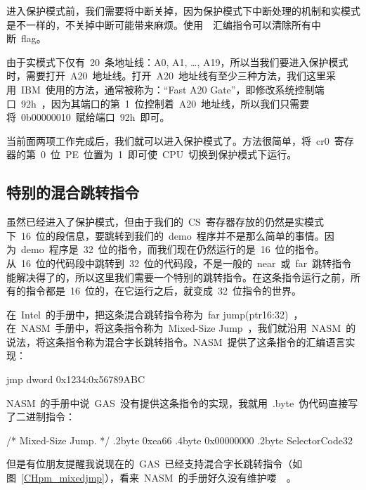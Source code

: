 进入保护模式前，我们需要将中断关掉，因为保护模式下中断处理的机制和实模式是不一样的，不关掉中断可能带来麻烦。使用~~汇编指令可以清除所有中断~flag。

由于实模式下仅有~20~条地址线：A0, A1, \ldots, A19，所以当我们要进入保护模式时，需要打开~A20~地址线。打开~A20~地址线有至少三种方法，我们这里采用~IBM~使用的方法，通常被称为：“Fast A20 Gate”，即修改系统控制端口~92h~，因为其端口的第~1~位控制着~A20~地址线，所以我们只需要将~0b00000010~赋给端口~92h~即可。

当前面两项工作完成后，我们就可以进入保护模式了。方法很简单，将~cr0~寄存器的第~0~位~PE~位置为~1~即可使~CPU~切换到保护模式下运行。

\label{CHpm_enablepm}

\subsection{特别的混合跳转指令}

虽然已经进入了保护模式，但由于我们的~CS~寄存器存放的仍然是实模式下~16~位的段信息，要跳转到我们的~demo~程序并不是那么简单的事情。因为~demo~程序是~32~位的指令，而我们现在仍然运行的是~16~位的指令。从~16~位的代码段中跳转到~32~位的代码段，不是一般的~near~或~far~跳转指令能解决得了的，所以这里我们需要一个特别的跳转指令。在这条指令运行之前，所有的指令都是~16~位的，在它运行之后，就变成~32~位指令的世界。

在~Intel~的手册中，把这条混合跳转指令称为~far jump(ptr16:32)~，在~NASM~手册中，将这条指令称为~Mixed-Size Jump~，我们就沿用~NASM~的说法，将这条指令称为混合字长跳转指令。NASM~提供了这条指令的汇编语言实现：
\begin{Command}
jmp dword 0x1234:0x56789ABC
\end{Command}
NASM~的手册中说~GAS~没有提供这条指令的实现，我就用~.byte~伪代码直接写了二进制指令：
\begin{Command}
/* Mixed-Size Jump. */
.2byte  0xea66
.4byte  0x00000000
.2byte  SelectorCode32
\end{Command}
但是有位朋友提醒我说现在的~GAS~已经支持混合字长跳转指令（如图~\ref{CHpm_mixedjmp}），看来~NASM~的手册好久没有维护喽~\smiley~。

\label{CHpm_mixedjmp}

